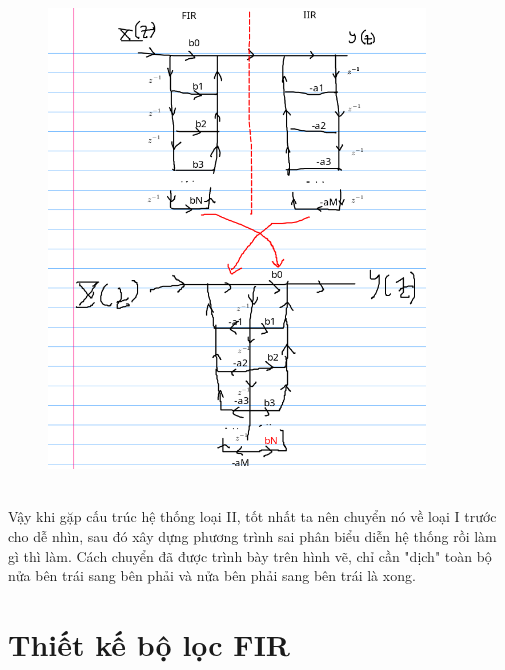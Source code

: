 \documentclass{article}
\begin{document}
\begin{figure}[H]
  \begin{center}
  \includegraphics[width=10cm]{2..png}
  \end{center}
  \end{figure} 
\\ Vậy khi gặp cấu trúc hệ thống loại II, tốt nhất ta nên chuyển nó về loại I trước cho dễ nhìn, sau đó xây dựng phương trình sai phân biểu diễn hệ thống rồi làm gì thì làm. Cách chuyển đã được trình bày trên hình vẽ, chỉ cần "dịch" toàn bộ nửa bên trái sang bên phải và nửa bên phải sang bên trái là xong.
\section{Thiết kế bộ lọc FIR}
\end{document}
